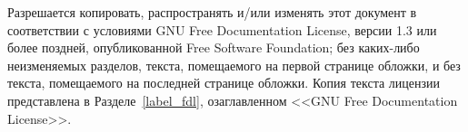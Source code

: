 \newpage


Разрешается копировать, распространять и/или изменять этот документ в
соответствии с условиями GNU Free Documentation License, версии 1.3 или
более поздней, опубликованной Free Software Foundation; без каких-либо
неизменяемых разделов, текста, помещаемого на первой странице обложки, и
без текста, помещаемого на последней странице обложки. Копия текста
лицензии представлена в Разделе~\ref{label_fdl}, озаглавленном <<GNU Free
Documentation License>>.

\newpage
